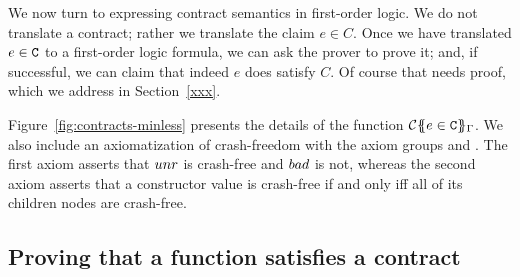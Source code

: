 We now turn to expressing contract semantics in first-order logic. 
We do not translate a contract; rather we translate the claim $e \in C$.
Once we have translated $e \in {\tt C}$ to a first-order logic formula, we can
ask the prover to prove it; and, if successful, we can claim that indeed
$e$ does satisfy $C$.  Of course that needs proof, which we address in Section~\ref{xxx}.

Figure~\ref{fig:contracts-minless} presents the details of the 
function ${\cal C}\{\!\!\{e \in {\tt C}\}\!\!\}_{\Gamma}$.  We also include 
an axiomatization of crash-freedom with the axiom groups  and 
. The first axiom asserts that $\mathop{unr}$ is crash-free and $\mathop{bad}$ is not, 
whereas the second axiom asserts that a constructor value is crash-free if and only iff 
all of its children nodes are crash-free. 

\subsection{Proving that a function satisfies a contract}

